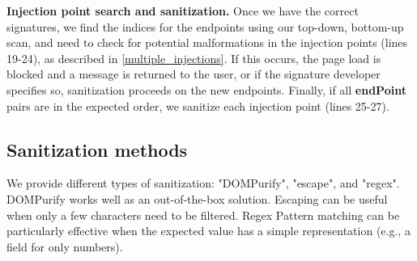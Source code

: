 \textbf{Injection point search and sanitization.}
Once we have the correct signatures, we find the indices for the endpoints using our top-down, bottom-up scan, and need to check for potential malformations in the injection points (lines 19-24), as described in \autoref{multiple_injections}. If this occurs, the page load is blocked and a message is returned to the user, or if the signature developer specifies so, sanitization proceeds on the new endpoints. Finally, if all \textbf{endPoint} pairs are in the expected order, we sanitize each injection point (lines 25-27).

\subsection{Sanitization methods} \label{sanitization_methods}
We provide different types of sanitization: "DOMPurify", "escape", and "regex". DOMPurify works well as an out-of-the-box solution. Escaping can be useful when only a few characters need to be filtered. Regex Pattern matching can be particularly effective when the expected value has a simple representation (e.g., a field for only numbers). 
